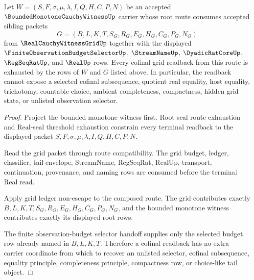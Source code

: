 \begin{theorem}
\label{thm:bounded-monotone-cauchy-witness-cofinal-grid-readback-exhaustion}
Let $W=(S,F,\sigma,\mu,\lambda,I,Q,H,C,P,N)$ be an accepted $\BoundedMonotoneCauchyWitnessUp$ carrier whose root route consumes accepted sibling packets
$$
G=(B,L,K,T,S_G,R_G,E_G,H_G,C_G,P_G,N_G)
$$
from $\RealCauchyWitnessGridUp$ together with the displayed $\FiniteObservationBudgetSelectorUp$, $\StreamNameUp$, $\DyadicRatCoreUp$, $\RegSeqRatUp$, and $\RealUp$ rows. Every cofinal grid readback from this route is exhausted by the rows of $W$ and $G$ listed above. In particular, the readback cannot expose a selected cofinal subsequence, quotient real equality, host equality, trichotomy, countable choice, ambient completeness, compactness, hidden grid state, or unlisted observation selector.
\end{theorem}
\begin{proof}
Project the bounded monotone witness first. Root seal route exhaustion and Real-seal threshold exhaustion constrain every terminal readback to the displayed packet $S,F,\sigma,\mu,\lambda,I,Q,H,C,P,N$.

Read the grid packet through route compatibility. The grid budget, ledger, classifier, tail envelope, StreamName, RegSeqRat, RealUp, transport, continuation, provenance, and naming rows are consumed before the terminal Real read.

Apply grid ledger non-escape to the composed route. The grid contributes exactly $B,L,K,T,S_G,R_G,E_G,H_G,C_G,P_G,N_G$, and the bounded monotone witness contributes exactly its displayed root rows.

The finite observation-budget selector handoff supplies only the selected budget row already named in $B,L,K,T$. Therefore a cofinal readback has no extra carrier coordinate from which to recover an unlisted selector, cofinal subsequence, equality principle, completeness principle, compactness row, or choice-like tail object.
\end{proof}

